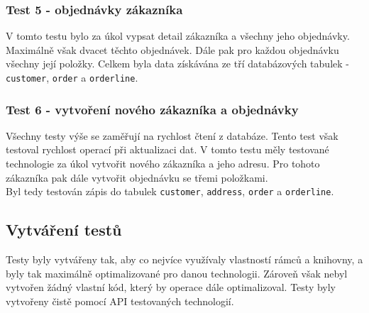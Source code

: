 \documentclass[ing,male,java,dept456]{diploma}						%
\begin{document}
\subsubsection{Test 5 - objednávky zákazníka}
V tomto testu bylo za úkol vypsat detail zákazníka a všechny jeho objednávky. Maximálně však dvacet těchto objednávek. Dále pak pro každou objednávku všechny její položky.
Celkem byla data získávána ze tří databázových tabulek - \lstinline[style=inlinepython]|customer|, \lstinline[style=inlinepython]|order| a \lstinline[style=inlinepython]|orderline|.

\subsubsection{Test 6 - vytvoření nového zákazníka a objednávky}
Všechny testy výše se zaměřují na rychlost čtení z databáze. Tento test však testoval rychlost operací při aktualizaci dat. V tomto testu měly testované technologie za úkol vytvořit nového zákazníka a jeho adresu. Pro tohoto zákazníka pak dále vytvořit objednávku se třemi položkami. \\
Byl tedy testován zápis do tabulek \lstinline[style=inlinepython]|customer|, \lstinline[style=inlinepython]|address|, \lstinline[style=inlinepython]|order| a \lstinline[style=inlinepython]|orderline|.

\subsection{Vytváření testů}
Testy byly vytvářeny tak, aby co nejvíce využívaly vlastností rámců a knihovny, a byly tak maximálně optimalizované pro danou technologii. Zároveň však nebyl vytvořen žádný vlastní kód, který by operace dále optimalizoval. Testy byly vytvořeny čistě pomocí API testovaných technologií. 
\end{document}
